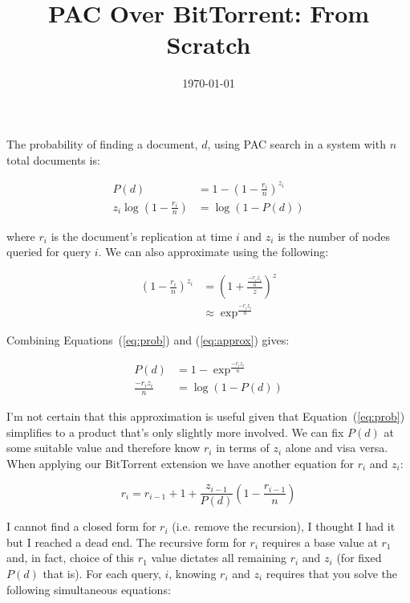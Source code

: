 \documentclass[12pt]{article}
\title{PAC Over BitTorrent: From Scratch}
\date{\today}
\begin{document}
\maketitle

The probability of finding a document, $d$, using PAC search in a system with $n$ total documents is:

\begin{align}
                          P(d) &= 1 - (1 - \frac{r_i}{n})^{z_i} \\
    z_i\log(1 - \frac{r_i}{n}) &= \log(1-P(d))
    \label{eq:prob}
\end{align}

where $r_i$ is the document's replication at time $i$ and $z_i$ is the number of nodes queried for query $i$. We can also approximate using the following:

\begin{align}
    (1 - \frac{r_i}{n})^{z_i} &= (1 + \frac{\frac{-r_iz_i}{n}}{z})^z \\
                            ~ &\approx \exp^{\frac{-r_iz_i}{n}}
    \label{eq:approx}
\end{align}

Combining Equations~(\ref{eq:prob}) and (\ref{eq:approx}) gives:

\begin{align}
       P(d) &= 1 - \exp^{\frac{-r_iz_i}{n}} \\
    \frac{-r_iz_i}{n} &= \log(1 - P(d))
\end{align}

I'm not certain that this approximation is useful given that Equation~(\ref{eq:prob}) simplifies to a product that's only slightly more involved.  We can fix $P(d)$ at some suitable value and therefore know $r_i$ in terms of $z_i$ alone and visa versa. When applying our BitTorrent extension we have another equation for $r_i$ and $z_i$:

\begin{equation}
    r_i = r_{i-1} + 1 + \frac{z_{i-1}}{P(d)}(1-\frac{r_{i-1}}{n})
\end{equation}

I cannot find a closed form for $r_i$ (i.e. remove the recursion), I thought I had it but I reached a dead end. The recursive form for $r_i$ requires a base value at $r_1$ and, in fact, choice of this $r_1$ value dictates all remaining $r_i$ and $z_i$ (for fixed $P(d)$ that is). For each query, $i$, knowing $r_i$ and $z_i$ requires that you solve the following simultaneous equations:
\end{document}
